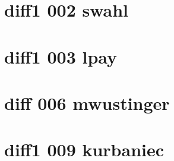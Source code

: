 \documentclass{article}
\begin{document}


\section*{diff1 002 swahl}


\section*{diff1 003 lpay}




\section*{diff 006 mwustinger}




\section*{diff1 009 kurbaniec}



\end{document}
